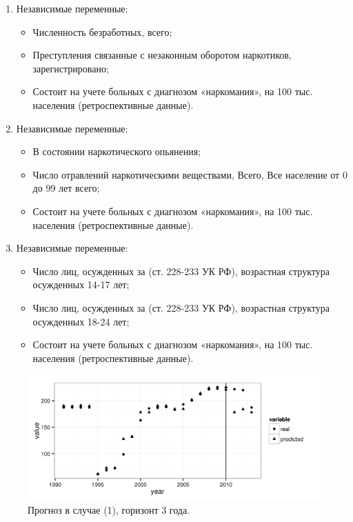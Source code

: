 \documentclass[a4paper,14pt]{article}
\begin{document}
\begin{enumerate}
    \item Независимые переменные:
    \begin{itemize}
        \item Численность безработных, всего;
        \item Преступления связанные с незаконным оборотом наркотиков, 
            зарегистрировано;
        \item Состоит на учете больных с диагнозом «наркомания», на 100 тыс. 
            населения (ретроспективные данные).
    \end{itemize}
    \item Независимые переменные:
    \begin{itemize}
        \item В состоянии наркотического опьянения;
        \item Число отравлений наркотическими веществами, Всего, Все население 
            от 0 до 99 лет  всего;
        \item Состоит на учете больных с диагнозом «наркомания», на 100 тыс. 
            населения (ретроспективные данные).
    \end{itemize}
    \item Независимые переменные:
    \begin{itemize}
        \item Число лиц, осужденных за (ст. 228-233 УК РФ), возрастная структура 
            осужденных  14-17 лет;
        \item Число лиц, осужденных за (ст. 228-233 УК РФ), возрастная структура 
            осужденных  18-24 лет;
        \item Состоит на учете больных с диагнозом «наркомания», на 100 тыс. 
            населения (ретроспективные данные).
    \end{itemize}			
\end{enumerate}

\begin{figure}[bhtp]
    \begin{center}
        \includegraphics{images/m_plot1.png}
        \caption{Прогноз в случае (1), горизонт 3 года.}		
        \label{figure:m_plot1}
    \end{center}
\end{figure}
\end{document}

